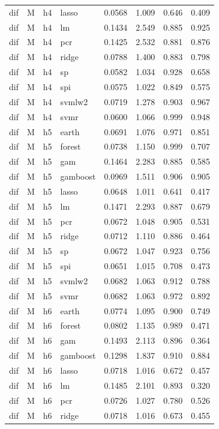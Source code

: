 \begin{ThreePartTable}
\begin{longtable}[t]{llclcccc}
dif & M & h4 & lasso & 0.0568 & 1.009 & 0.646 & 0.409\\
dif & M & h4 & lm & 0.1434 & 2.549 & 0.885 & 0.925\\
dif & M & h4 & pcr & 0.1425 & 2.532 & 0.881 & 0.876\\
dif & M & h4 & ridge & 0.0788 & 1.400 & 0.883 & 0.798\\
dif & M & h4 & sp & 0.0582 & 1.034 & 0.928 & 0.658\\
dif & M & h4 & spi & 0.0575 & 1.022 & 0.849 & 0.575\\
dif & M & h4 & svmlw2 & 0.0719 & 1.278 & 0.903 & 0.967\\
dif & M & h4 & svmr & 0.0600 & 1.066 & 0.999 & 0.948\\
\addlinespace
dif & M & h5 & earth & 0.0691 & 1.076 & 0.971 & 0.851\\
dif & M & h5 & forest & 0.0738 & 1.150 & 0.999 & 0.707\\
dif & M & h5 & gam & 0.1464 & 2.283 & 0.885 & 0.585\\
dif & M & h5 & gamboost & 0.0969 & 1.511 & 0.906 & 0.905\\
dif & M & h5 & lasso & 0.0648 & 1.011 & 0.641 & 0.417\\
dif & M & h5 & lm & 0.1471 & 2.293 & 0.887 & 0.679\\
dif & M & h5 & pcr & 0.0672 & 1.048 & 0.905 & 0.531\\
dif & M & h5 & ridge & 0.0712 & 1.110 & 0.886 & 0.464\\
dif & M & h5 & sp & 0.0672 & 1.047 & 0.923 & 0.756\\
dif & M & h5 & spi & 0.0651 & 1.015 & 0.708 & 0.473\\
dif & M & h5 & svmlw2 & 0.0682 & 1.063 & 0.912 & 0.788\\
dif & M & h5 & svmr & 0.0682 & 1.063 & 0.972 & 0.892\\
\addlinespace
dif & M & h6 & earth & 0.0774 & 1.095 & 0.900 & 0.749\\
dif & M & h6 & forest & 0.0802 & 1.135 & 0.989 & 0.471\\
dif & M & h6 & gam & 0.1493 & 2.113 & 0.896 & 0.364\\
dif & M & h6 & gamboost & 0.1298 & 1.837 & 0.910 & 0.884\\
dif & M & h6 & lasso & 0.0718 & 1.016 & 0.672 & 0.457\\
dif & M & h6 & lm & 0.1485 & 2.101 & 0.893 & 0.320\\
dif & M & h6 & pcr & 0.0726 & 1.027 & 0.780 & 0.526\\
dif & M & h6 & ridge & 0.0718 & 1.016 & 0.673 & 0.455\\

\end{longtable}
\end{ThreePartTable}
